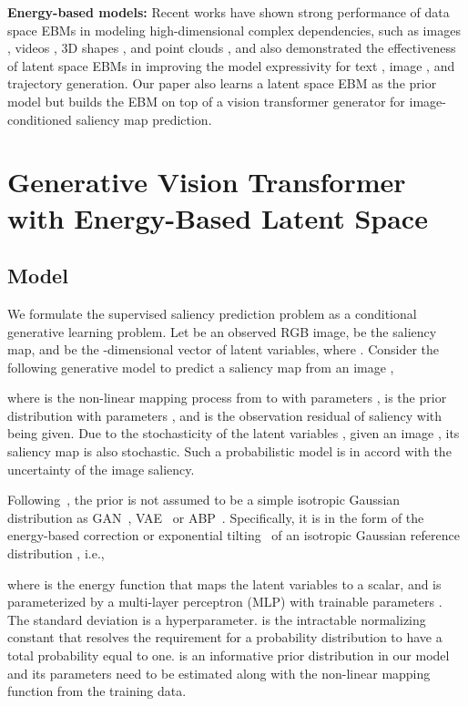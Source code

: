 \documentclass{article}
\begin{document}
\noindent\textbf{Energy-based models:} Recent works have shown strong performance of data space EBMs \cite{xie2016theory,nijkamp2019learning} in modeling high-dimensional complex dependencies, such as images \cite{ZhengXL21,ZhaoXL21,GaoLZZW18,DuM19,GaoSPWK21}, videos \cite{XieZW17,XieZW21}, 3D shapes \cite{XieZGWZW18,xie2020generative}, and point clouds \cite{XieXZZW21}, and also demonstrated the effectiveness of latent space EBMs \cite{ebm_prior} in improving the model expressivity for text \cite{PangW21}, image \cite{ebm_prior}, and trajectory \cite{PangZ0W21} generation. Our paper also learns a latent space EBM as the prior model but builds the EBM on top of a vision transformer generator for image-conditioned saliency map prediction.




\section{Generative Vision Transformer with Energy-Based Latent Space}


\subsection{Model}


We formulate the supervised saliency prediction problem as a conditional generative learning problem. Let  be an observed RGB image,  be the saliency map, and  be the -dimensional vector of latent variables, where . Consider the following generative model to predict a saliency map  from an image ,

where  is the non-linear mapping process from  to  with parameters ,  is the prior distribution with parameters , and  is the observation residual of saliency with  being given. Due to the stochasticity of the latent variables , given an image , its saliency map is also stochastic. Such a probabilistic model is in accord with the uncertainty of the image saliency.  

Following~\cite{ebm_prior}, the prior  is not assumed to be a simple isotropic Gaussian distribution as GAN~\cite{GAN_nips}, VAE~\cite{vae_bayes_kumar, structure_output} or ABP~\cite{abp}. 
Specifically, it is in the form of the energy-based correction or exponential tilting~\cite{xie2016theory} of an isotropic Gaussian reference distribution , i.e., 

where  is the energy function that maps the latent variables  to a scalar, and  is parameterized by a multi-layer perceptron (MLP) with trainable parameters . The standard deviation  is a hyperparameter.  is the intractable normalizing constant that resolves the requirement for a probability distribution to have a total probability equal to one.  is an informative prior distribution in our model and its parameters  need to be estimated along with the non-linear mapping function  from the training data.
\end{document}
